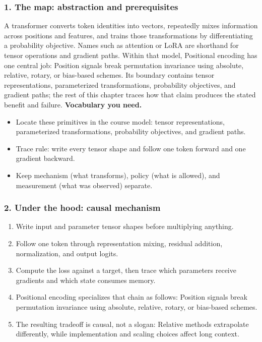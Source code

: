 \subsubsection*{1. The map: abstraction and prerequisites}
A transformer converts token identities into vectors, repeatedly mixes information across positions and features, and trains those transformations by differentiating a probability objective. Names such as attention or LoRA are shorthand for tensor operations and gradient paths.
Within that model, Positional encoding has one central job: Position signals break permutation invariance using absolute, relative, rotary, or bias-based schemes. Its boundary contains tensor representations, parameterized transformations, probability objectives, and gradient paths; the rest of this chapter traces how that claim produces the stated benefit and failure.
\textbf{Vocabulary you need.}\begin{itemize}
\item Locate these primitives in the course model: tensor representations, parameterized transformations, probability objectives, and gradient paths.
\item Trace rule: write every tensor shape and follow one token forward and one gradient backward.
\item Keep mechanism (what transforms), policy (what is allowed), and measurement (what was observed) separate.
\end{itemize}
\subsubsection*{2. Under the hood: causal mechanism}\begin{enumerate}
\item Write input and parameter tensor shapes before multiplying anything.
\item Follow one token through representation mixing, residual addition, normalization, and output logits.
\item Compute the loss against a target, then trace which parameters receive gradients and which state consumes memory.
\item Positional encoding specializes that chain as follows: Position signals break permutation invariance using absolute, relative, rotary, or bias-based schemes.
\item The resulting tradeoff is causal, not a slogan: Relative methods extrapolate differently, while implementation and scaling choices affect long context.
\end{enumerate}
